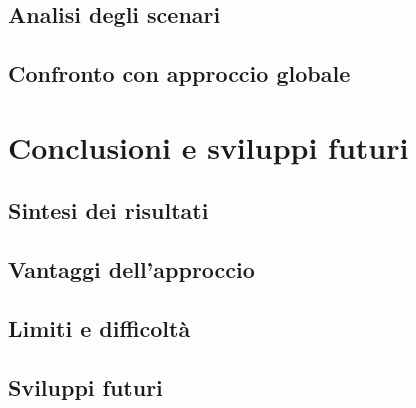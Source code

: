 \documentclass[a4paper,12pt]{report}
\begin{document}
\section{Analisi degli scenari}
\section{Confronto con approccio globale}

\chapter{Conclusioni e sviluppi futuri}
\section{Sintesi dei risultati}
\section{Vantaggi dell’approccio}
\section{Limiti e difficoltà}
\section{Sviluppi futuri}

\end{document}
